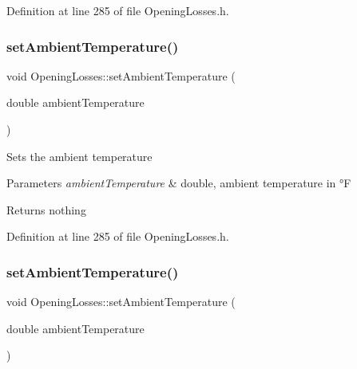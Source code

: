 Definition at line 285 of file Opening\+Losses.\+h.

\mbox{\label{class_opening_losses_a3624c9fad2a413871b7324f7e957a5ae}} 
\subsubsection{\texorpdfstring{set\+Ambient\+Temperature()}{setAmbientTemperature()}\hspace{0.1cm}{\footnotesize\ttfamily [2/3]}}
{\footnotesize\ttfamily void Opening\+Losses\+::set\+Ambient\+Temperature (\begin{DoxyParamCaption}\item[{double}]{ambient\+Temperature }\end{DoxyParamCaption})\hspace{0.3cm}{\ttfamily [inline]}}

Sets the ambient temperature


\begin{DoxyParams}{Parameters}
{\em ambient\+Temperature} & double, ambient temperature in °F\\
\hline
\end{DoxyParams}
\begin{DoxyReturn}{Returns}
nothing 
\end{DoxyReturn}


Definition at line 285 of file Opening\+Losses.\+h.

\mbox{\label{class_opening_losses_a3624c9fad2a413871b7324f7e957a5ae}} 
\subsubsection{\texorpdfstring{set\+Ambient\+Temperature()}{setAmbientTemperature()}\hspace{0.1cm}{\footnotesize\ttfamily [3/3]}}
{\footnotesize\ttfamily void Opening\+Losses\+::set\+Ambient\+Temperature (\begin{DoxyParamCaption}\item[{double}]{ambient\+Temperature }\end{DoxyParamCaption})\hspace{0.3cm}{\ttfamily [inline]}}

